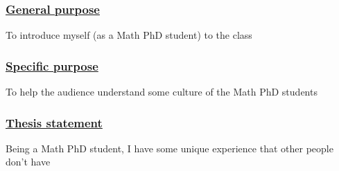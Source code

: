 \documentclass[12pt,a4paper]{article}
\begin{document}
\subsubsection*{\underline{General purpose}}
To introduce myself (as a Math PhD student) to the class
\subsubsection*{\underline{Specific purpose}}
To help the audience understand some culture of the Math PhD students
\subsubsection*{\underline{Thesis statement}} 
Being a Math PhD student, I have some unique experience that other people don't have
\end{document}
